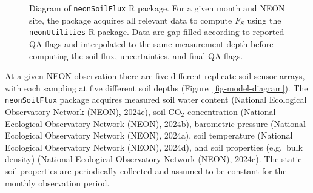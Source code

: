 \documentclass[
  letterpaper,
  DIV=11,
  numbers=noendperiod]{scrartcl}
\begin{document}
\begin{figure}


\caption{\label{fig-package-diagram}Diagram of \texttt{neonSoilFlux} R
package. For a given month and NEON site, the package acquires all
relevant data to compute \(F_{S}\) using the \texttt{neonUtilities} R
package. Data are gap-filled according to reported QA flags and
interpolated to the same measurement depth before computing the soil
flux, uncertainties, and final QA flags.}

\end{figure}%

At a given NEON observation there are five different replicate soil
sensor arrays, with each sampling at five different soil depths
(Figure~\ref{fig-model-diagram}). The \texttt{neonSoilFlux} package
acquires measured soil water content (National Ecological Observatory
Network (NEON), 2024e), soil CO\(_{2}\) concentration (National
Ecological Observatory Network (NEON), 2024b), barometric pressure
(National Ecological Observatory Network (NEON), 2024a), soil
temperature (National Ecological Observatory Network (NEON), 2024d), and
soil properties (e.g.~bulk density) (National Ecological Observatory
Network (NEON), 2024c). The static soil properties are periodically
collected and assumed to be constant for the monthly observation period.
\end{document}
